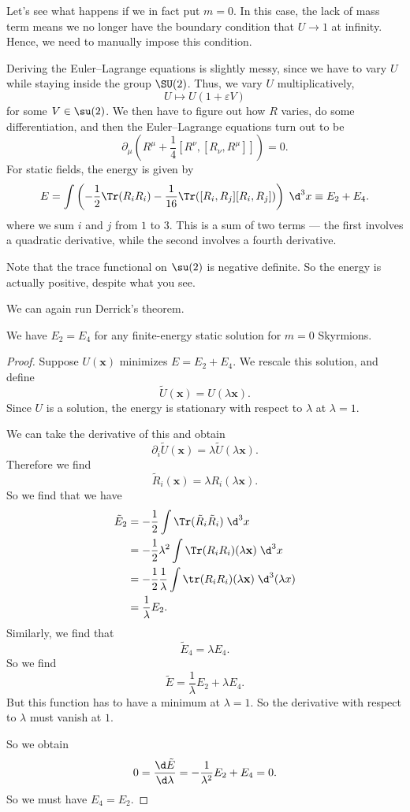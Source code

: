 \documentclass[a4paper]{article}
\begin{document}
Let's see what happens if we in fact put $m = 0$. In this case, the lack of mass term means we no longer have the boundary condition that $U \to 1$ at infinity. Hence, we need to manually impose this condition.

Deriving the Euler--Lagrange equations is slightly messy, since we have to vary $U$ while staying inside the group $\SU(2)$. Thus, we vary $U$ multiplicatively,
\[
  U \mapsto U (1 + \varepsilon V)
\]
for some $V \in \su(2)$. We then have to figure out how $R$ varies, do some differentiation, and then the Euler--Lagrange equations turn out to be
\[
  \partial_\mu \left(R^\mu + \frac{1}{4} [R^\nu, [R_\nu, R^\mu]]\right) = 0.
\]
For static fields, the energy is given by
\[
  E = \int \left(-\frac{1}{2} \Tr(R_i R_i) - \frac{1}{16} \Tr([R_i, R_j] [R_i, R_j])\right)\;\d^3 x \equiv E_2 + E_4.
\]
where we sum $i$ and $j$ from $1$ to $3$. This is a sum of two terms --- the first involves a quadratic derivative, while the second involves a fourth derivative.

Note that the trace functional on $\su(2)$ is negative definite. So the energy is actually positive, despite what you see.

We can again run Derrick's theorem.
\begin{thm}
  We have $E_2 = E_4$ for any finite-energy static solution for $m = 0$ Skyrmions.
\end{thm}

\begin{proof}
  Suppose $U(\mathbf{x})$ minimizes $E = E_2 + E_4$. We rescale this solution, and define
  \[
    \tilde{U}(\mathbf{x}) = U(\lambda \mathbf{x}).
  \]
  Since $U$ is a solution, the energy is stationary with respect to $\lambda$ at $\lambda = 1$.

  We can take the derivative of this and obtain
  \[
    \partial_i \tilde{U}(\mathbf{x}) = \lambda \tilde{U}(\lambda \mathbf{x}).
  \]
  Therefore we find
  \[
    \tilde{R}_i(\mathbf{x}) = \lambda R_i(\lambda \mathbf{x}).
  \]
  So we find that we have
  \begin{align*}
    \tilde{E}_2 &= - \frac{1}{2} \int \Tr(\tilde{R}_i \tilde{R}_i) \;\d^3 x\\
    &= - \frac{1}{2} \lambda^2 \int \Tr(R_i R_i)(\lambda \mathbf{x})\;\d^3 x\\
    &= - \frac{1}{2} \frac{1}{\lambda} \int \tr(R_i R_i) (\lambda \mathbf{x})\;\d^3 (\lambda x)\\
    &= \frac{1}{\lambda} E_2.
  \end{align*}
  Similarly, we find that
  \[
    \tilde{E}_4 = \lambda E_4.
  \]
  So we find
  \[
    \tilde{E} = \frac{1}{\lambda} E_2 + \lambda E_4.
  \]
  But this function has to have a minimum at $\lambda = 1$. So the derivative with respect to $\lambda$ must vanish at $1$.

  So we obtain
  \[
    0 = \frac{\d \tilde{E}}{\d \lambda} = - \frac{1}{\lambda^2}E_2 + E_4 = 0.
  \]
  So we must have $E_4 = E_2$.
\end{proof}
\end{document}
